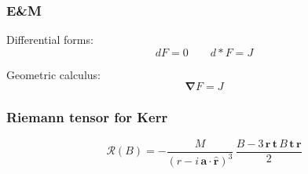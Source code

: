 \documentclass[12pt,xcolor={dvipsnames}]{beamer}
\renewcommand{\vec}{\bm}
\begin{document}
\begin{frame}
  \frametitle{E\&M}
  Differential forms:
  \begin{equation*}
    dF = 0 \qquad d\ast F = J
  \end{equation*}
  \pause

  Geometric calculus:
  \begin{equation*}
    \vec{\nabla} F = J
  \end{equation*}
\end{frame}

\begin{frame}
  \frametitle{Riemann tensor for Kerr}
  \begin{equation*}
    \mathcal{R}(B) = - \frac{M} {(r-i\, \vec{a} \cdot
      \hat{\vec{r}})^{3}}\, \frac{B - 3\, \vec{r}\, \vec{t}\, B\,
      \vec{t}\, \vec{r}} {2}
  \end{equation*}
\end{frame}
\end{document}
